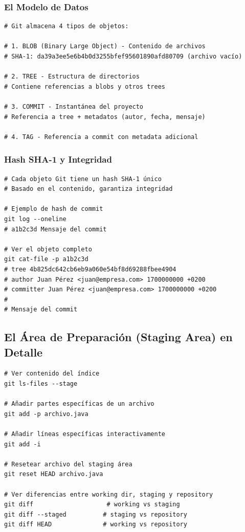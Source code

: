 \documentclass[12pt,a4paper]{article}
\begin{document}
\subsubsection{El Modelo de Datos}
\begin{lstlisting}[caption=Estructura interna de objetos Git]
# Git almacena 4 tipos de objetos:

# 1. BLOB (Binary Large Object) - Contenido de archivos
# SHA-1: da39a3ee5e6b4b0d3255bfef95601890afd80709 (archivo vacío)

# 2. TREE - Estructura de directorios  
# Contiene referencias a blobs y otros trees

# 3. COMMIT - Instantánea del proyecto
# Referencia a tree + metadatos (autor, fecha, mensaje)

# 4. TAG - Referencia a commit con metadata adicional
\end{lstlisting}

\subsubsection{Hash SHA-1 y Integridad}
\begin{lstlisting}[caption=Verificación de integridad con SHA-1]
# Cada objeto Git tiene un hash SHA-1 único
# Basado en el contenido, garantiza integridad

# Ejemplo de hash de commit
git log --oneline
# a1b2c3d Mensaje del commit

# Ver el objeto completo
git cat-file -p a1b2c3d
# tree 4b825dc642cb6eb9a060e54bf8d69288fbee4904
# author Juan Pérez <juan@empresa.com> 1700000000 +0200
# committer Juan Pérez <juan@empresa.com> 1700000000 +0200
# 
# Mensaje del commit
\end{lstlisting}

\subsection{El Área de Preparación (Staging Area) en Detalle}
\begin{lstlisting}[caption=Manipulación avanzada del staging area]
# Ver contenido del índice
git ls-files --stage

# Añadir partes específicas de un archivo
git add -p archivo.java

# Añadir líneas específicas interactivamente
git add -i

# Resetear archivo del staging área
git reset HEAD archivo.java

# Ver diferencias entre working dir, staging y repository
git diff                    # working vs staging
git diff --staged          # staging vs repository  
git diff HEAD              # working vs repository
\end{lstlisting}
\end{document}
